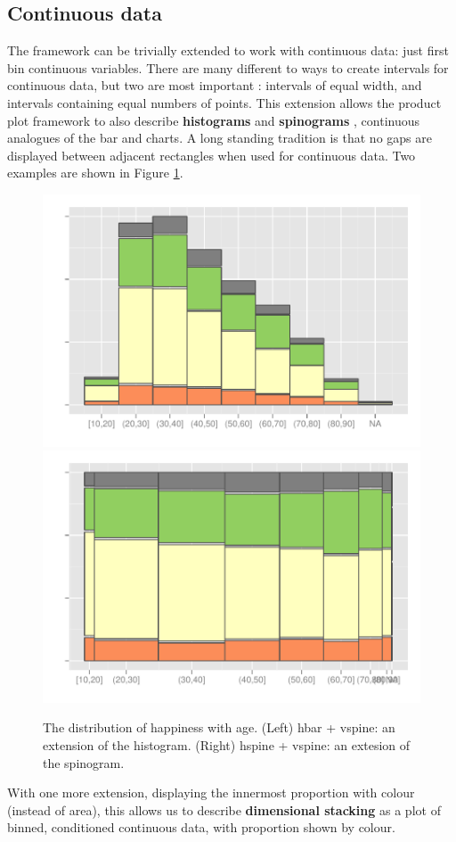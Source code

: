 \documentclass[journal]{vgtc}
\begin{document}
\subsection{Continuous data}
\label{sub:continuous_data}

The framework can be trivially extended to work with continuous data: just first bin continuous variables. There are many different to ways to create intervals for continuous data, but two are most important \citep{denby:2009}: intervals of equal width, and intervals containing equal numbers of points. This extension allows the product plot framework to also describe {\bf histograms} and {\bf spinograms} \citep{hummel:1996}, continuous analogues of the bar and charts. A long standing tradition is that no gaps are displayed between adjacent rectangles when used for continuous data. Two examples are shown in Figure \ref{fig:cont-examples}.

\begin{figure}[htbp]
  \centering
  \includegraphics[width=0.5\linewidth]{cont-hbar}%
  \includegraphics[width=0.5\linewidth]{cont-hspine}
  
  \caption{The distribution of happiness with age. (Left) hbar + vspine: an extension of the histogram. (Right) hspine + vspine: an extesion of the spinogram.}
  \label{fig:cont-examples}
\end{figure}

With one more extension, displaying the innermost proportion with colour (instead of area), this allows us to describe {\bf dimensional stacking} \citep{leblanc:1990} as a plot of binned, conditioned continuous data, with proportion shown by colour. 
\end{document}

